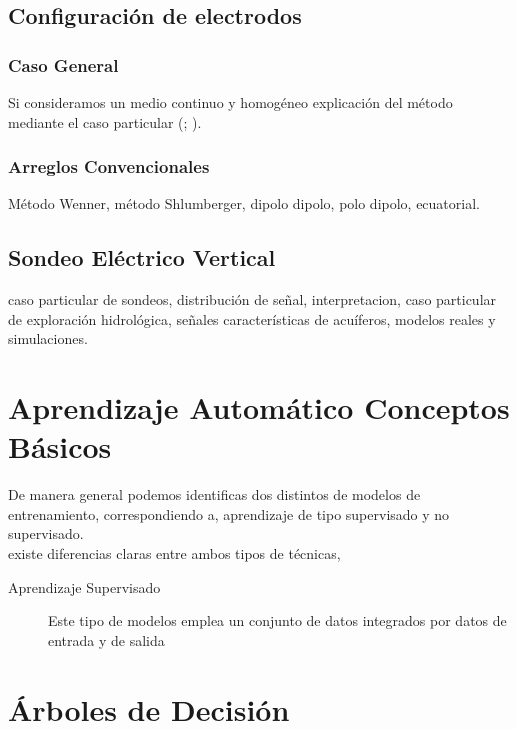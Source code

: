 		\subsection{Configuración de electrodos}
			\subsubsection{Caso General}
				Si consideramos un medio continuo y homogéneo explicación del método mediante el caso particular (\cite{reynolds2011}; \cite{igboama2023}).\\
				  
			\subsubsection{Arreglos Convencionales}
				Método Wenner, método Shlumberger, dipolo dipolo, polo dipolo, ecuatorial.\\
				
		\subsection{Sondeo Eléctrico Vertical}
		caso particular de sondeos, distribución de señal, interpretacion, caso particular de exploración hidrológica, señales características de acuíferos, modelos reales y simulaciones.\\
	\section{Aprendizaje Automático Conceptos Básicos}
		De manera general podemos identificas dos distintos de modelos de entrenamiento, correspondiendo a, aprendizaje de tipo supervisado y no supervisado.\\
		
		existe diferencias claras entre ambos tipos de técnicas,
		
		\begin{description}
			\item[Aprendizaje Supervisado] Este tipo de modelos emplea un conjunto de datos integrados por datos de entrada y de salida
		\end{description}
		
		 
	\section{Árboles de Decisión}
